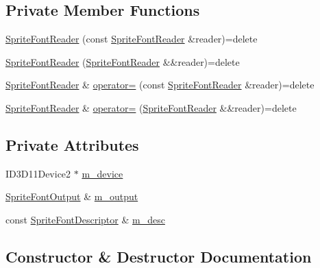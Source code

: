 \subsection*{Private Member Functions}
\begin{DoxyCompactItemize}
\item 
\hyperlink{classmage_1_1_sprite_font_reader_a81f2b8ceab31ea5006d2bef498a03bbc}{Sprite\+Font\+Reader} (const \hyperlink{classmage_1_1_sprite_font_reader}{Sprite\+Font\+Reader} \&reader)=delete
\item 
\hyperlink{classmage_1_1_sprite_font_reader_a2130816e03384c99af146a21795ac5e8}{Sprite\+Font\+Reader} (\hyperlink{classmage_1_1_sprite_font_reader}{Sprite\+Font\+Reader} \&\&reader)=delete
\item 
\hyperlink{classmage_1_1_sprite_font_reader}{Sprite\+Font\+Reader} \& \hyperlink{classmage_1_1_sprite_font_reader_a4de55b4bebfabb5f1c32078864baef11}{operator=} (const \hyperlink{classmage_1_1_sprite_font_reader}{Sprite\+Font\+Reader} \&reader)=delete
\item 
\hyperlink{classmage_1_1_sprite_font_reader}{Sprite\+Font\+Reader} \& \hyperlink{classmage_1_1_sprite_font_reader_aae3c6305ea97146bd85b2d93a037d47d}{operator=} (\hyperlink{classmage_1_1_sprite_font_reader}{Sprite\+Font\+Reader} \&\&reader)=delete
\end{DoxyCompactItemize}
\subsection*{Private Attributes}
\begin{DoxyCompactItemize}
\item 
I\+D3\+D11\+Device2 $\ast$ \hyperlink{classmage_1_1_sprite_font_reader_aa89bb54d21caf942e56780bf6e229810}{m\+\_\+device}
\item 
\hyperlink{structmage_1_1_sprite_font_output}{Sprite\+Font\+Output} \& \hyperlink{classmage_1_1_sprite_font_reader_a3df62ce71f85745c493b142c726261b3}{m\+\_\+output}
\item 
const \hyperlink{structmage_1_1_sprite_font_descriptor}{Sprite\+Font\+Descriptor} \& \hyperlink{classmage_1_1_sprite_font_reader_a6951665c0a5fda28ea6784945565cb6e}{m\+\_\+desc}
\end{DoxyCompactItemize}


\subsection{Constructor \& Destructor Documentation}
\hypertarget{classmage_1_1_sprite_font_reader_ab257bc3c1f787182c14da56545ff6d10}{}\label{classmage_1_1_sprite_font_reader_ab257bc3c1f787182c14da56545ff6d10} 
